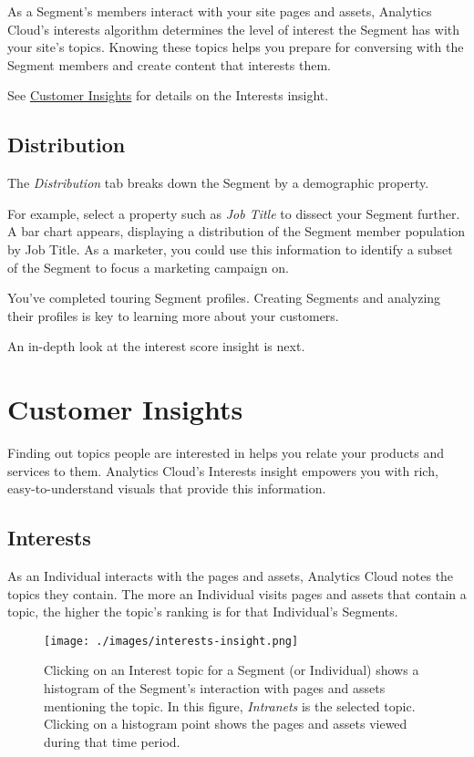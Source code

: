As a Segment's members interact with your site pages and assets,
Analytics Cloud's interests algorithm determines the level of interest
the Segment has with your site's topics. Knowing these topics helps you
prepare for conversing with the Segment members and create content that
interests them.

See
\href{https://github.com/liferay/liferay-docs/blob/7.1.x/discover/analytics-cloud/articles/03-understanding-people/04-customer-insights.markdown}{Customer
Insights} for details on the Interests insight.

\subsection{Distribution}\label{distribution}

The \emph{Distribution} tab breaks down the Segment by a demographic
property.

For example, select a property such as \emph{Job Title} to dissect your
Segment further. A bar chart appears, displaying a distribution of the
Segment member population by Job Title. As a marketer, you could use
this information to identify a subset of the Segment to focus a
marketing campaign on.

You've completed touring Segment profiles. Creating Segments and
analyzing their profiles is key to learning more about your customers.

An in-depth look at the interest score insight is next.

\section{Customer Insights}\label{customer-insights}

Finding out topics people are interested in helps you relate your
products and services to them. Analytics Cloud's Interests insight
empowers you with rich, easy-to-understand visuals that provide this
information.

\subsection{Interests}\label{interests-2}

As an Individual interacts with the pages and assets, Analytics Cloud
notes the topics they contain. The more an Individual visits pages and
assets that contain a topic, the higher the topic's ranking is for that
Individual's Segments.

\begin{figure}
\centering
\texttt{[image: ./images/interests-insight.png]}
\caption{Clicking on an Interest topic for a Segment (or Individual)
shows a histogram of the Segment's interaction with pages and assets
mentioning the topic. In this figure, \emph{Intranets} is the selected
topic. Clicking on a histogram point shows the pages and assets viewed
during that time period.}
\end{figure}

